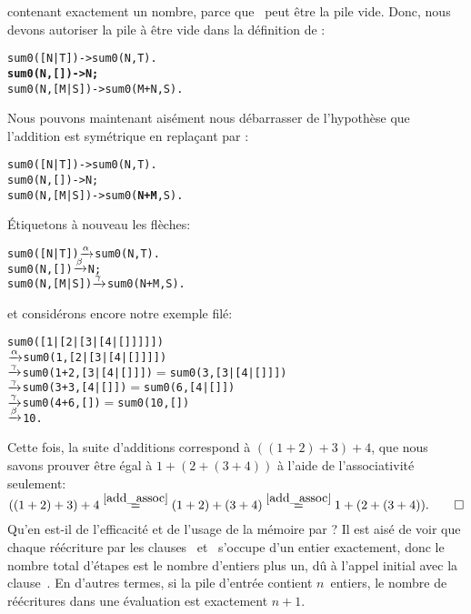 contenant exactement un nombre, parce que ~peut être la
pile vide. Donc, nous devons autoriser la pile à être vide dans la
définition de :
\begin{alltt}
sum0([N|T])   -> sum0(N,T).
\textbf{sum0(N,   []) -> N;}
sum0(N,[M|S]) -> sum0(M+N,S).
\end{alltt}
Nous pouvons maintenant aisément nous débarrasser de l'hypothèse que
l'addition est symétrique en replaçant  par
:
\begin{alltt}
sum0([N|T])   -> sum0(N,T).
sum0(N,   []) -> N;
sum0(N,[M|S]) -> sum0(\textbf{N+M},S).
\end{alltt}
Étiquetons à nouveau les flèches:
\begin{alltt}
sum0([N|T])   \(\xrightarrow{\smash[t]{\alpha}}\) sum0(N,T).
sum0(N,   []) \(\xrightarrow{\smash[t]{\beta}}\) N;
sum0(N,[M|S]) \(\xrightarrow{\smash[t]{\gamma}}\) sum0(N+M,S).
\end{alltt}
et considérons encore notre exemple filé:
\begin{alltt}
sum0([1|[2|[3|[4|[]]]]])
          \(\xrightarrow{\smash[t]{\alpha}}\) sum0(1,[2|[3|[4|[]]]])
          \(\xrightarrow{\smash[t]{\gamma}}\) sum0(1+2,[3|[4|[]]])   \(=\) sum0(3,[3|[4|[]]])
          \(\xrightarrow{\smash[t]{\gamma}}\) sum0(3+3,[4|[]])       \(=\) sum0(6,[4|[]])
          \(\xrightarrow{\smash[t]{\gamma}}\) sum0(4+6,[])           \(=\) sum0(10,[])
          \(\xrightarrow{\smash[t]{\beta}}\) 10\textrm{.}
\end{alltt}
Cette fois, la suite d'additions correspond à \(((1+2)+3)+4\), que
nous savons prouver être égal à \(1+(2+(3+4))\) à l'aide de
l'associativité seulement:
\begin{equation*}
((1 + 2) + 3) + 4
  \mathrel{\stackrel{\smash{\ref{add_assoc}}}{=}} (1 + 2) + (3 + 4)
  \mathrel{\stackrel{\smash{\ref{add_assoc}}}{=}} 1 + (2 + (3 + 4)).\qquad\Box
\end{equation*}
Qu'en est-il de l'efficacité et de l'usage de la mémoire par
? Il est aisé de voir que chaque réécriture par les
clauses~\clause{\beta} et~\clause{\gamma} s'occupe d'un entier
exactement, donc le nombre total d'étapes est le nombre d'entiers plus
un, dû à l'appel initial avec la clause~\clause{\alpha}. En d'autres
termes, si la pile d'entrée contient \(n\)~entiers, le nombre de
réécritures dans une évaluation est exactement \(n+1\).

